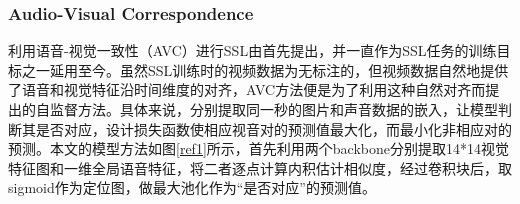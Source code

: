 \documentclass[12pt]{article}
\begin{document}
\subsubsection{Audio-Visual Correspondence}
利用语音-视觉一致性（AVC）进行SSL由\cite{object}首先提出，并一直作为SSL任务的训练目标之一延用至今。虽然SSL训练时的视频数据为无标注的，但视频数据自然地提供了语音和视觉特征沿时间维度的对齐，AVC方法便是为了利用这种自然对齐而提出的自监督方法。具体来说，分别提取同一秒的图片和声音数据的嵌入，让模型判断其是否对应，设计损失函数使相应视音对的预测值最大化，而最小化非相应对的预测。本文的模型方法如图\ref{ref1}所示，首先利用两个backbone分别提取14*14视觉特征图和一维全局语音特征，将二者逐点计算内积估计相似度，经过卷积块后，取sigmoid作为定位图，做最大池化作为“是否对应”的预测值。
\begin{figure}[!h]
  \centering
\end{figure}
\end{document}
